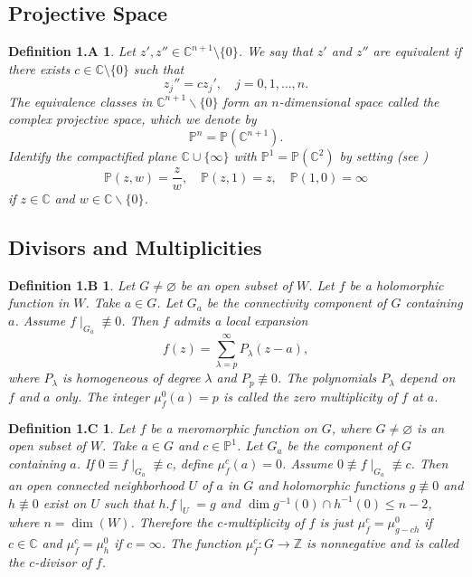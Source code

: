 \documentclass[11pt,reqno]{amsart}
\newtheorem*{defi1A}{Definition 1.A}
\newtheorem*{defi1B}{Definition 1.B}
\newtheorem*{defi1C}{Definition 1.C}
\numberwithin{equation}{section}
\begin{document}
\subsection*{Projective Space}

\begin{defi1A}\cite[pp. 7]{Nishino-2001}
	Let $z',z''\in\mathbb{C}^{n+1}\setminus\{0\}$. We say that $z'$ and $z''$ are equivalent if there exists $c\in\mathbb{C}\setminus\{0\}$ such that
	\[
	z_j''=c z_j', \quad j=0,1,\ldots,n.
	\]
	The equivalence classes in $\mathbb{C}^{n+1} \backslash  \{0\}$ form an 
$n$-dimensional space called the complex projective space, which we denote by
	\[
	\mathbb{P}^n=\mathbb{P}(\mathbb{C}^{n+1}).
	\]
	Identify the compactified plane $\mathbb{C}\cup\{\infty\}$ with $\mathbb{P}^1=\mathbb{P}(\mathbb{C}^2)$ by setting (see \cite[pp. 634-635]{Stoll-1983})
	\[
	\mathbb{P}(z,w)=\frac{z}{w}, \quad
	\mathbb{P}(z,1)=z, \quad
	\mathbb{P}(1,0)=\infty
	\]
	if $z\in\mathbb{C}$ and $w\in\mathbb{C}\backslash \{0\}$.
\end{defi1A}

\subsection*{Divisors and Multiplicities}

\begin{defi1B}\cite[pp. 12]{Stoll-1974}
	Let $G\neq \varnothing$ be an open subset of $W$. Let $f$ be a holomorphic function in $W$.
Take $a\in G$. Let $G_a$ be the connectivity component of $G$ containing $a$. Assume $f\mid_{G_a}\not\equiv 0$. Then $f$ admits a local expansion
	\[
	f(z)=\sum_{\lambda=p}^{\infty}P_\lambda(z-a),
	\]
	where $P_\lambda$ is homogeneous of degree $\lambda$ and $P_p\not\equiv0$. The polynomials $P_{\lambda}$ depend on $f$ and $a$ only.
	The integer $\mu_f^0(a)=p$ is called the zero multiplicity of $f$ at $a$.
\end{defi1B}

\begin{defi1C}\cite[pp. 12]{Stoll-1974}
Let $f$ be a meromorphic function on $G$, where $G\neq \varnothing$ is an open subset of $W$.
Take $a\in G$ and $c\in\mathbb{P}^1$. Let $G_a$ be the component of $G$ containing $a$. If $0\equiv f\mid_{G_a}\not\equiv c$, define $\mu^c_f(a)=0$. Assume $0\not\equiv f\mid_{G_a}\not\equiv c$. Then an open connected neighborhood $U$ of $a$ in $G$ and holomorphic functions $g\not\equiv 0$ and $h\not\equiv 0$ exist on $U$ such that $h. f\mid_U=g$ and $\dim g^{-1}(0)\cap h^{-1}(0)\leq n-2$, where $n=\dim(W)$. Therefore the $c$-multiplicity of $f$ is just $\mu^c_f=\mu^0_{g-ch}$ if $c\in\mathbb{C}$ and $\mu^c_f=\mu^0_h$ if $c=\infty$. The function $\mu^c_f:G\to \mathbb{Z}$ is nonnegative and is called the $c$-divisor of $f$. 
\end{defi1C}
\end{document}
